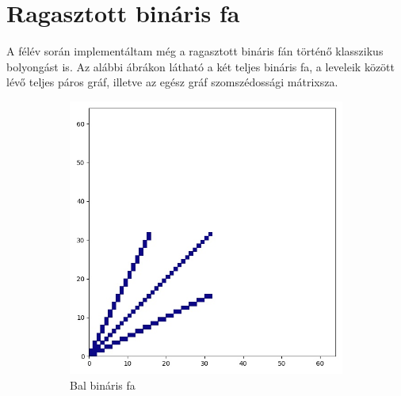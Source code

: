 \section{Ragasztott bináris fa}

A félév során implementáltam még a ragasztott bináris fán történő klasszikus
bolyongást is. Az alábbi ábrákon látható a két teljes bináris fa, a leveleik között
lévő teljes páros gráf, illetve az egész gráf szomszédossági mátrixsza.

\begin{figure}[H]
  \centering
  \begin{subfigure}{.3\linewidth}
    \centering
    \includegraphics[width=\linewidth]{./figures/ragasztott_binaris/subgraph_00.jpg}
    \caption{Bal bináris fa}
  \end{subfigure}
  \begin{subfigure}{.3\linewidth}
    \centering

\end{subfigure}
\end{figure}
